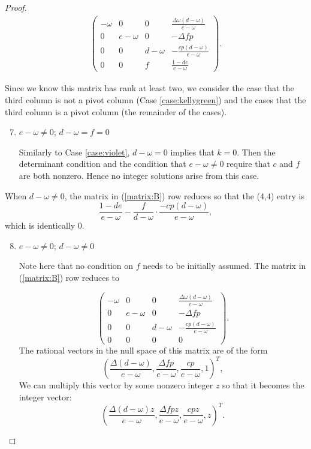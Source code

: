\documentclass{amsart}     %
\theoremstyle{definition}
\begin{document}
\begin{proof}
\begin{align} \tag{B} \label{matrix:B} \begin{pmatrix} -\omega  & 0 & 0 &  \frac{\Delta \omega ( d -\omega )}{e - \omega } \\
 0& e - \omega  & 0 & -\Delta f p\\ 
0 & 0 & d - \omega   & -\frac{ cp ( d -\omega )}{e - \omega } \\ 
0 & 0 & f &  \frac{1-de }{e-\omega}\end{pmatrix}.\end{align}

Since we know this matrix has rank at least two, we consider the case that the third column is not a pivot column (Case \ref{case:kellygreen}) and the cases that the third column is a pivot column (the remainder of the cases).

\begin{enumerate}\setcounter{enumi}{6}


\item\label{case:kellygreen} $e - \omega  \neq 0$; $d - \omega  = f =  0$

Similarly to Case \ref{case:violet}, $d- \omega = 0$ implies that $k = 0$. Then the determinant condition and the condition that $e - \omega  \neq 0$ require that $c$ and $ f$ are both nonzero. Hence no integer solutions arise from this case.

\end{enumerate}


When $d- \omega  \neq 0$, the matrix in (\ref{matrix:B}) row reduces so that the (4,4) entry is  $$ \frac{1-de }{e-\omega}- \frac{f}{d-\omega }\cdot \frac{ -cp ( d -\omega )}{e - \omega } , $$ which is identically 0. 

\begin{enumerate}\setcounter{enumi}{7}
\item\label{case:rainbow} $e-\omega  \neq 0$; $d - \omega  \neq 0$ 

Note here that no condition on $f$ needs to be initially assumed. The matrix in (\ref{matrix:B}) row reduces to

\[ \begin{pmatrix} -\omega  & 0 & 0 &  \frac{\Delta \omega ( d -\omega )}{e - \omega } \\
 0& e - \omega  & 0 & -\Delta f p\\ 
0 & 0 & d - \omega   & -\frac{ cp ( d -\omega )}{e - \omega } \\ 
0 & 0 & 0 & 0\end{pmatrix}.\]
%
The rational vectors in the null space of this matrix are of the form $$\left( \frac{\Delta (d-\omega) }{e - \omega}, \frac{\Delta f p }{e-\omega }, \frac{ cp }{e - \omega }, 1\right)^T, $$
%
We can multiply this vector by some nonzero integer $z$ so that it becomes the integer vector: $$\left( \frac{\Delta (d-\omega) z}{e - \omega}, \frac{\Delta f p z}{e-\omega }, \frac{ cp z}{e - \omega }, z\right)^T. $$


\end{enumerate}
\end{proof}
\end{document}
